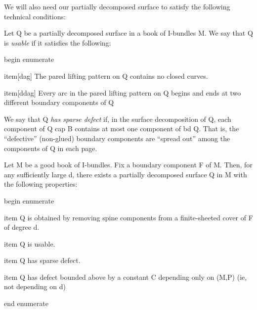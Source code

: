 We will also need our partially decomposed surface to satisfy the following
technical conditions:

\begin{defn}

Let Q be a partially decomposed surface in a book of I-bundles M. We say that
Q is \emph{usable} if it satisfies the following:

begin enumerate

item[dag] The pared lifting pattern on Q contains no closed curves.

item[ddag] Every arc in the pared lifting pattern on Q begins and ends at two
different boundary components of Q

\end{defn}

\begin{defn}

We say that Q \emph{has sparse defect} if, in the surface decomposition of Q,
each component of Q cap B contains at most one component of bd Q. That is, the
``defective'' (non-glued) boundary components are ``spread out'' among the
components of Q in each page.

\end{defn}

\begin{lemma}\label{L:jigsaw}

Let M be a good book of I-bundles. Fix a boundary component F of M. Then, for
any sufficiently large d, there exists a partially decomposed surface Q in
M with the following properties:

begin enumerate

item Q is obtained by removing spine components from a finite-sheeted cover of
F of degree d.

item Q is usable.

item Q has sparse defect.

item Q has defect bounded above by a constant C depending only on (M,P) (ie,
not depending on d)

end enumerate

\end{lemma}

